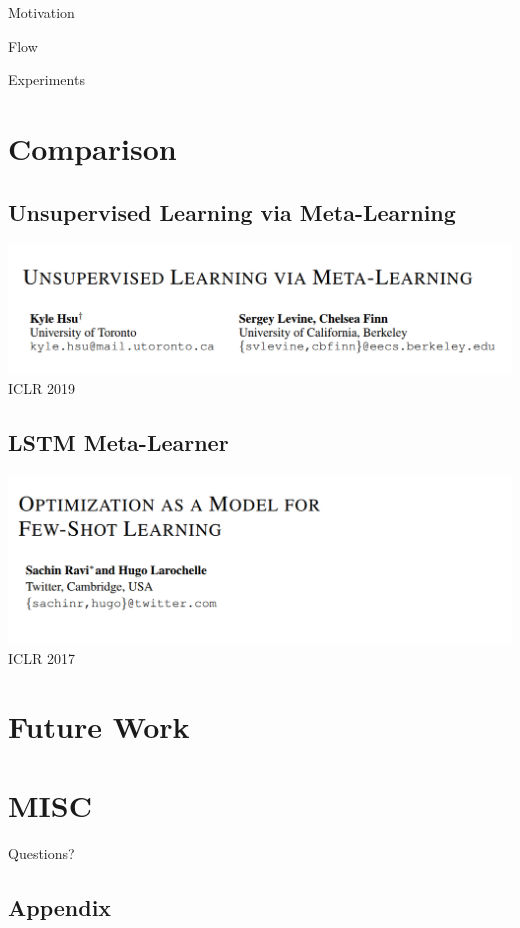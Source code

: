 \documentclass{beamer}
\newcommand{\weib}{\CJKfamily{weib}}
\begin{document}
\begin{frame}{Motivation}
\end{frame}

\begin{frame}{Flow}
\end{frame}

\begin{frame}{Experiments}
\end{frame}

\section{Comparison}
\subsection{Unsupervised Learning via Meta-Learning}

\begin{frame}
  \includegraphics[width=\textwidth]{fig/ULML.png}
  \center ICLR 2019
\end{frame}

\subsection{LSTM Meta-Learner}
\begin{frame}
  \includegraphics[width=\textwidth]{fig/LSTM-Meta-Learner.png}
  \center ICLR 2017
\end{frame}

\section{Future Work}

\section{MISC}
\begin{frame}
	\begin{center}
    \LARGE{Questions?}
	\end{center}
\end{frame}


\subsection{Appendix}
\end{document}
